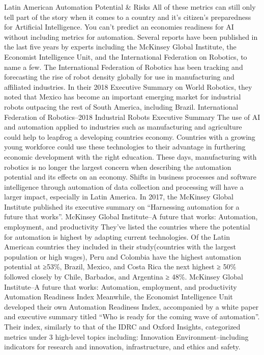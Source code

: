 \documentclass[conference]{IEEEtran}
\begin{document}
Latin American Automation Potential \& Risks
All of these metrics can still only tell part of the story when it comes to a country and it's citizen's preparedness for Artificial Intelligence. You can't predict an economies readiness for AI without including metrics for automation. Several reports have been published in the last five years by experts including the McKinsey Global Institute, the Economist Intelligence Unit, and the International Federation on Robotics, to name a few.
The International Federation of Robotics has been tracking and forecasting the rise of robot density globally for use in manufacturing and affiliated industries. In their 2018 Executive Summary on World Robotics, they noted that Mexico has become an important emerging market for industrial robots outpacing the rest of South America, including Brazil.
International Federation of Robotics--2018 Industrial Robots Executive Summary
The use of AI and automation applied to industries such as manufacturing and agriculture could help to leapfrog a developing countries economy. Countries with a growing young workforce could use these technologies to their advantage in furthering economic development with the right education.
These days, manufacturing with robotics is no longer the largest concern when describing the automation potential and its effects on an economy. Shifts in business processes and software intelligence through automation of data collection and processing will have a larger impact, especially in Latin America. In 2017, the McKinsey Global Institute published its executive summary on ``Harnessing automation for a future that works''.
McKinsey Global Institute--A future that works: Automation, employment, and productivity
They've listed the countries where the potential for automation is highest by adapting current technologies. Of the Latin American countries they included in their study(countries with the largest population or high wages), Peru and Colombia have the highest automation potential at ≥53\%, Brazil, Mexico, and Costa Rica the next highest ≥ 50\% followed closely by Chile, Barbados, and Argentina ≥ 48\%.
McKinsey Global Institute--A future that works: Automation, employment, and productivity
Automation Readiness Index
Meanwhile, the Economist Intelligence Unit developed their own Automation Readiness Index, accompanied by a white paper and executive summary titled ``Who is ready for the coming wave of automation''. Their index, similarly to that of the IDRC and Oxford Insights, categorized metrics under 3 high-level topics including:
Innovation Environment--including indicators for research and innovation, infrastructure, and ethics and safety.
\end{document}
